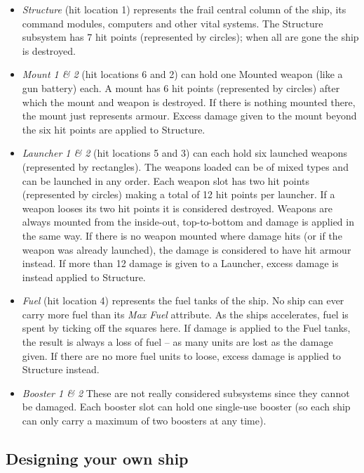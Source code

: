 \documentclass[a4paper,12pt,notitlepage,twocolumn]{article}
\begin{document}
\begin{itemize}
\item \emph{Structure} (hit location 1) represents the frail central column of the
  ship, its command modules, computers and other vital systems. The
  Structure subsystem has 7 hit points (represented by circles); when
  all are gone the ship is destroyed. 
\item \emph{Mount 1 \& 2} (hit locations 6 and 2) can hold one Mounted weapon (like a gun
  battery) each. A mount has 6 hit points (represented by circles)
  after which the mount and weapon is destroyed. If there is nothing
  mounted there, the mount just represents armour. Excess damage given
  to the mount beyond the six hit points are applied to Structure. 
\item \emph{Launcher 1 \& 2} (hit locations 5 and 3) can each hold six launched weapons
  (represented by rectangles). The weapons loaded can be of mixed types and
  can be launched in any order. Each weapon slot has two hit points
  (represented by circles) making a total of 12 hit points per
  launcher. If a weapon looses its two hit points it is considered
  destroyed. Weapons are always mounted from the
  inside-out, top-to-bottom and damage is applied in the same way. If
  there is no weapon mounted where damage hits (or if the weapon was
  already launched), the damage is considered to
  have hit armour instead. If more than 12 damage is given to a
  Launcher, excess damage is instead applied to Structure. 
\item \emph{Fuel} (hit location 4) represents the fuel tanks of the
  ship. No ship can ever carry more fuel than its \emph{Max Fuel}
  attribute. As the ships accelerates, fuel is spent by ticking off
  the squares here. If damage is applied to the Fuel tanks, the result
  is always a loss of fuel -- as many units are lost as the damage
  given. If there are no more fuel units to loose, excess damage is
  applied to Structure instead. 
\item \emph{Booster 1 \& 2} These are not really considered subsystems
  since they cannot be damaged. Each booster slot can hold one
  single-use booster (so each ship can only carry a maximum of two
  boosters at any time).  
\end{itemize}

\subsection{Designing your own ship}
\end{document}
